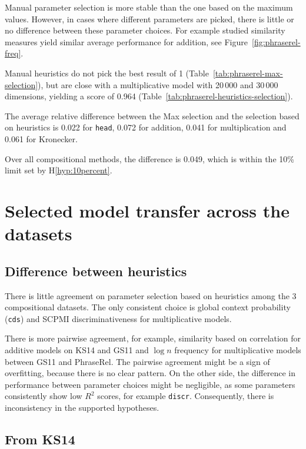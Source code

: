 Manual parameter selection is more stable than the one based on the maximum values. However, in cases where different parameters are picked, there is little or no difference between these parameter choices. For example studied similarity measures yield similar average performance for addition, see Figure~\ref{fig:phraserel-freq}.

Manual heuristics do not pick the best result of 1 (Table~\ref{tab:phraserel-max-selection}), but are close with a multiplicative model with 20\,000 and 30\,000 dimensions, yielding a score of 0.964 (Table~\ref{tab:phraserel-heuristics-selection}).

The average relative difference between the Max selection and the selection based on heuristics is 0.022 for \texttt{head}, 0.072 for addition, 0.041 for multiplication and 0.061 for Kronecker.

Over all compositional methods, the difference is 0.049, which is within the 10\% limit set by H\ref{hyp:10percent}.

\section{Selected model transfer across the datasets}
\label{sec:select-model-transf-comp}



\subsection{Difference between heuristics}
\label{sec:diff-betw-heur-comp}

There is little agreement on parameter selection based on heuristics among the 3 compositional datasets. The only consistent choice is global context probability (\texttt{cds}) and SCPMI discriminativeness for multiplicative models.

There is more pairwise agreement, for example, similarity based on correlation for additive models on KS14 and GS11 and $\log n$ frequency for multiplicative models between GS11 and PhraseRel. The pairwise agreement might be a sign of overfitting, because there is no clear pattern. On the other side, the difference in performance between parameter choices might be negligible, as some parameters consistently show low $R^2$ scores, for example \texttt{discr}. Consequently, there is inconsistency in the supported hypotheses.

\subsection{From KS14}
\label{sec:from-ks14}

